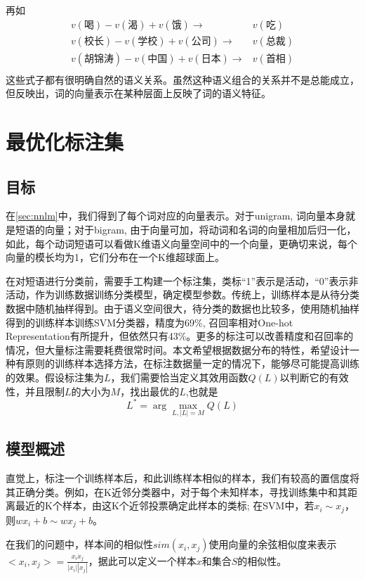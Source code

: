 再如
\begin{align*}
	v(\text{喝}) - v(\text{渴}) + v(\text{饿}) \rightarrow & v(\text{吃}) \\
	v(\text{校长}) - v(\text{学校}) + v(\text{公司}) \rightarrow & v(\text{总裁}) \\
	v(\text{胡锦涛}) - v(\text{中国}) + v(\text{日本}) \rightarrow & v(\text{首相}) \\
\end{align*}
这些式子都有很明确自然的语义关系。虽然这种语义组合的关系并不是总能成立，但反映出，词的向量表示在某种层面上反映了词的语义特征。

\section{最优化标注集}
\subsection{目标}
在\ref{sec:nnlm}中，我们得到了每个词对应的向量表示。对于unigram, 词向量本身就是短语的向量；对于bigram, 由于向量可加，将动词和名词的向量相加后归一化，如此，每个动词短语可以看做K维语义向量空间中的一个向量，更确切来说，每个向量的模长均为1，它们分布在一个K维超球面上。

在对短语进行分类前，需要手工构建一个标注集，类标``1''表示是活动，``0''表示非活动，作为训练数据训练分类模型，确定模型参数。传统上，训练样本是从待分类数据中随机抽样得到。由于语义空间很大，待分类的数据也比较多，使用随机抽样得到的训练样本训练SVM分类器，精度为69\%, 召回率相对One-hot Representation有所提升，但依然只有43\%。更多的标注可以改善精度和召回率的情况，但大量标注需要耗费很常时间。本文希望根据数据分布的特性，希望设计一种有原则的训练样本选择方法，在标注数据量一定的情况下，能够尽可能提高训练的效果。假设标注集为$L$，我们需要恰当定义其效用函数$Q(L)$以判断它的有效性，并且限制$L$的大小为$M$，找出最优的$L$,也就是
\[
    L^* = \arg\max_{L,|L| = M} Q(L)
\]

\subsection{模型概述}
直觉上，标注一个训练样本后，和此训练样本相似的样本，我们有较高的置信度将其正确分类。例如，在K近邻分类器中，对于每个未知样本，寻找训练集中和其距离最近的K个样本，由这K个近邻投票确定此样本的类标; 在SVM中，若$x_i \sim x_j$，则$wx_i+b \sim wx_j+b$。

在我们的问题中，样本间的相似性$sim(x_i, x_j)$使用向量的余弦相似度来表示$<x_i, x_j>=\frac{x_i\dot x_j}{|x_i||x_j|}$，据此可以定义一个样本$x$和集合$S$的相似性。

